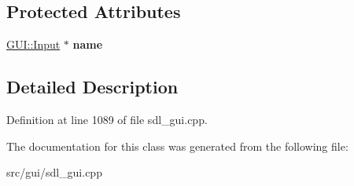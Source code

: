 \subsection*{Protected Attributes}
\begin{DoxyCompactItemize}
\item 
\hypertarget{classSetVsyncrate_a7c739c3ee8c8f232c6f753c531f88c59}{\hyperlink{classGUI_1_1Input}{G\-U\-I\-::\-Input} $\ast$ {\bfseries name}}\label{classSetVsyncrate_a7c739c3ee8c8f232c6f753c531f88c59}

\end{DoxyCompactItemize}


\subsection{Detailed Description}


Definition at line 1089 of file sdl\-\_\-gui.\-cpp.



The documentation for this class was generated from the following file\-:\begin{DoxyCompactItemize}
\item 
src/gui/sdl\-\_\-gui.\-cpp\end{DoxyCompactItemize}
